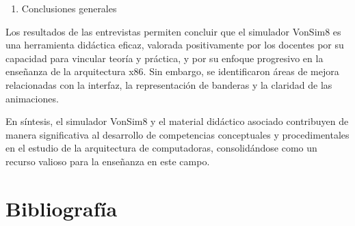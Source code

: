 \documentclass[12pt,oneside]{templates/unerthesis}
\providecommand{\tightlist}{%
  \setlength{\itemsep}{0pt}\setlength{\parskip}{0pt}}
\begin{document}
\begin{enumerate}
\def\labelenumi{\arabic{enumi}.}
\setcounter{enumi}{5}
\tightlist
\item
  Conclusiones generales
\end{enumerate}

Los resultados de las entrevistas permiten concluir que el simulador VonSim8 es una herramienta didáctica eficaz, valorada positivamente por los docentes por su capacidad para vincular teoría y práctica, y por su enfoque progresivo en la enseñanza de la arquitectura x86. Sin embargo, se identificaron áreas de mejora relacionadas con la interfaz, la representación de banderas y la claridad de las animaciones.

En síntesis, el simulador VonSim8 y el material didáctico asociado contribuyen de manera significativa al desarrollo de competencias conceptuales y procedimentales en el estudio de la arquitectura de computadoras, consolidándose como un recurso valioso para la enseñanza en este campo.

\hypertarget{Biblio}{%
\chapter{Bibliografía}\label{Biblio}}
\end{document}
